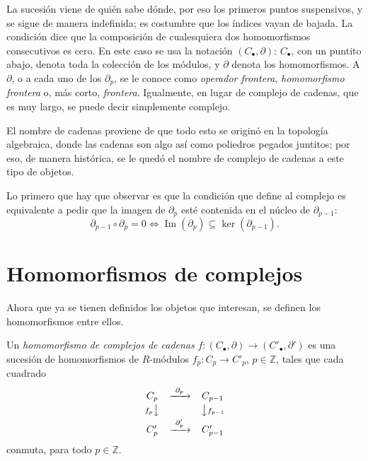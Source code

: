 \documentclass[11pt]{article}
\begin{document}
La sucesión viene de quién sabe dónde, por eso los primeros puntos suspensivos, y se sigue de manera indefinida; es costumbre que los índices vayan de bajada. La condición dice que la composición de cualesquiera dos homomorfismos consecutivos es cero. En este caso se usa la notación $(C_\bullet,\partial)$: $C_\bullet$, con un puntito abajo, denota toda la colección de los módulos, y $\partial$ denota los homomorfismos. A $\partial$, o a cada uno de los $\partial_p$, se le conoce como \emph{operador frontera}, \emph{homomorfismo frontera} o, más corto, \emph{frontera}. Igualmente, en lugar de \guillemotleft{}complejo de cadenas\guillemotright{}, que es muy largo, se puede decir simplemente \guillemotleft{}complejo\guillemotright{}.

El nombre de cadenas proviene de que todo esto se originó en la topología algebraica, donde las cadenas son algo así como poliedros pegados juntitos; por eso, de manera histórica, se le quedó el nombre de complejo de cadenas a este tipo de objetos.

Lo primero que hay que observar es que la condición que define al complejo es equivalente a pedir que la imagen de $\partial_p$ esté contenida en el núcleo de $\partial_{p-1}$:
\[
  \partial_{p-1}\circ\partial_p=0\iff\operatorname{Im}(\partial_p)\subseteq\ker(\partial_{p-1}).
\]

\section*{Homomorfismos de complejos}

Ahora que ya se tienen definidos los objetos que interesan, se definen los homomorfismos entre ellos.

\begin{defn}\label{def:hom-complejos}
Un \emph{homomorfismo de complejos de cadenas} $f\colon(C_\bullet,\partial)\to(C'_\bullet,\partial')$ es una sucesión de homomorfismos de $R$-módulos $f_p\colon C_p\to C'_p$, $p\in\mathbb Z$, tales que cada cuadrado
\[
  \begin{array}{ccc}
    C_p & \xrightarrow{\ \partial_p\ } & C_{p-1}\\[2pt]
    {\scriptstyle f_p}\big\downarrow & & \big\downarrow{\scriptstyle f_{p-1}}\\[2pt]
    C'_p & \xrightarrow{\ \partial'_p\ } & C'_{p-1}
  \end{array}
\]
conmuta, para todo $p\in\mathbb Z$.
\end{defn}
\end{document}
